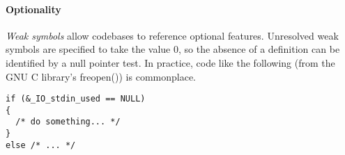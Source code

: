 

% 







\paragraph{Optionality}

\emph{Weak symbols} allow codebases to reference optional features. 
Unresolved weak symbols are specified to take the value 0, so 
the absence of a definition can be identified by a null pointer test.
In practice, code like the following (from the GNU C library's 
\textsf{freopen()}) is commonplace.

{\scriptsize\begin{lstlisting}
if (&_IO_stdin_used == NULL)
{
  /* do something... */
}
else /* ... */
\end{lstlisting}}

